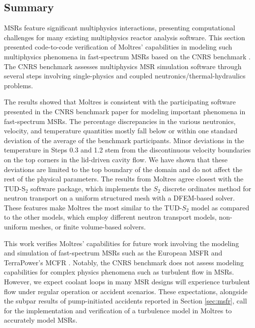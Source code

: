 \subsection{Summary}

\glspl{MSR} feature significant multiphysics interactions, presenting
computational challenges for many existing multiphysics reactor analysis
software. This section presented code-to-code verification of Moltres'
capabilities in modeling such multiphysics phenomena in fast-spectrum
\glspl{MSR} based on the CNRS benchmark \cite{tiberga_results_2020}.
The CNRS benchmark assesses multiphysics \gls{MSR} simulation
software through several steps involving single-physics and coupled
neutronics/thermal-hydraulics problems.

The results showed that Moltres is consistent with the participating software
presented in the CNRS benchmark paper for modeling important phenomena
in fast-spectrum \glspl{MSR}. The percentage discrepancies in the various
neutronics, velocity, and temperature quantities mostly fall below or within
one standard deviation of the average of the benchmark participants.
Minor deviations in the temperature in Steps 0.3 and 1.2 
stem from the discontinuous velocity
boundaries on the top corners in the lid-driven cavity flow. We have shown that
these deviations are limited to the top boundary of the domain and do not
affect the rest of the physical parameters. The results from
Moltres agree closest with the TUD-S$_2$ software package, which implements the
$S_2$ discrete ordinates method for
neutron transport on a uniform structured mesh with a \gls{DFEM}-based solver.
These features make Moltres the most similar to the TUD-$S_2$ model as compared
to the other models, which employ different neutron transport models,
non-uniform meshes, or finite volume-based solvers.

This work verifies Moltres' capabilities for future work involving the modeling and
simulation of fast-spectrum \glspl{MSR} such as the European \gls{MSFR} and
TerraPower's \gls{MCFR} \cite{terrapower_terrapower_2021}. Notably, the CNRS
benchmark does not assess modeling capabilities for complex physics phenomena
such as turbulent flow in \glspl{MSR}. However, we expect coolant loops in many \gls{MSR} designs
will experience turbulent flow under regular operation or accident scenarios.
These expectations, alongside the subpar results of pump-initiated accidents
reported in Section \ref{sec:msfr}, call for the implementation and
verification of a turbulence model in Moltres to accurately model \glspl{MSR}.

\FloatBarrier
